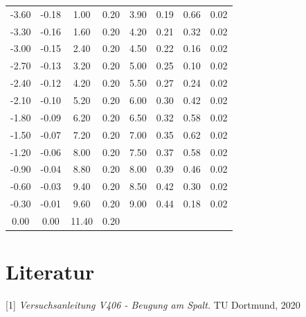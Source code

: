 \documentclass[titlepage = firstcover]{scrartcl}
\begin{document}
\begin{table}[h]
\begin{tabular}{c c c c | c c c c}
                -3.60   &  -0.18   &   1.00   &   0.20   &    3.90   &   0.19   &   0.66   &   0.02 \\
                -3.30   &  -0.16   &   1.60   &   0.20   &    4.20   &   0.21   &   0.32   &   0.02 \\
                -3.00   &  -0.15   &   2.40   &   0.20   &    4.50   &   0.22   &   0.16   &   0.02 \\
                -2.70   &  -0.13   &   3.20   &   0.20   &    5.00   &   0.25   &   0.10   &   0.02 \\
                -2.40   &  -0.12   &   4.20   &   0.20   &    5.50   &   0.27   &   0.24   &   0.02 \\
                -2.10   &  -0.10   &   5.20   &   0.20   &    6.00   &   0.30   &   0.42   &   0.02 \\
                -1.80   &  -0.09   &   6.20   &   0.20   &    6.50   &   0.32   &   0.58   &   0.02 \\
                -1.50   &  -0.07   &   7.20   &   0.20   &    7.00   &   0.35   &   0.62   &   0.02 \\
                -1.20   &  -0.06   &   8.00   &   0.20   &    7.50   &   0.37   &   0.58   &   0.02 \\
                -0.90   &  -0.04   &   8.80   &   0.20   &    8.00   &   0.39   &   0.46   &   0.02 \\
                -0.60   &  -0.03   &   9.40   &   0.20   &    8.50   &   0.42   &   0.30   &   0.02 \\
                -0.30   &  -0.01   &   9.60   &   0.20   &    9.00   &   0.44   &   0.18   &   0.02 \\
                 0.00   &   0.00   &  11.40   &   0.20 \\
                \bottomrule
            \end{tabular}
        \end{table}
  
      \FloatBarrier
    
    \newpage
    \section{Literatur}
        [1] \textit{Versuchsanleitung V406 - Beugung am Spalt.} TU Dortmund, 2020 \newline
\end{document}
